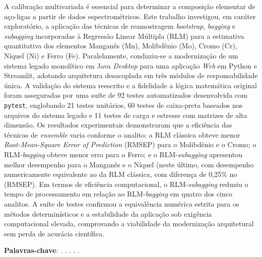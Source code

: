 \setlength{\absparsep}{18pt} %
\begin{resumo}
\SingleSpacing

A calibração multivariada é essencial para determinar a composição elementar de aço-ligas a partir de dados espectrométricos. Este trabalho investigou, em caráter exploratório, a aplicação das técnicas de reamostragem \textit{bootstrap}, \textit{bagging} e \textit{subagging} incorporadas à Regressão Linear Múltipla (RLM) para a estimativa quantitativa dos elementos Manganês (Mn), Molibdênio (Mo), Cromo (Cr), Níquel (Ni) e Ferro (Fe). Paralelamente, conduziu-se a modernização de um sistema legado monolítico em Java \textit{Desktop} para uma aplicação \textit{Web} em Python e Streamlit, adotando arquitetura desacoplada em três módulos de responsabilidade única. A validação do sistema reescrito e a fidelidade a lógica matemática original foram asseguradas por uma suíte de 92 testes automatizados desenvolvida com \texttt{pytest}, englobando 21 testes unitários, 60 testes de caixa-preta baseados nos arquivos do sistema legado e 11 testes de carga e estresse com matrizes de alta dimensão. Os resultados experimentais demonstraram que a eficiência das técnicas de \textit{ensemble} varia conforme o analito: a RLM clássica obteve menor \textit{Root-Mean-Square Error of Prediction} (RMSEP) para o Molibdênio e o Cromo; o RLM-\textit{bagging} obteve menor erro para o Ferro; e o RLM-\textit{subagging} apresentou melhor desempenho para o Manganês e o Níquel (neste último, com desempenho numericamente equivalente ao da RLM clássica, com diferença de 0,25\% no (RMSEP). Em termos de eficiência computacional, o RLM-\textit{subagging} reduziu o tempo de processamento em relação ao RLM-\textit{bagging} em quatro dos cinco analitos. A suíte de testes confirmou a equivalência numérica estrita para os métodos determinísticos e a estabilidade da aplicação sob exigência computacional elevada, comprovando a viabilidade da modernização arquitetural sem perda de acurácia científica.

\textbf{Palavras-chave}: \palavrachaveum. \palavrachavedois. \palavrachavetres. \palavrachavequatro. \palavrachavecinco.
\end{resumo}

